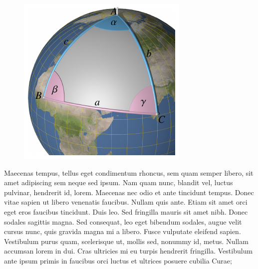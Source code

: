\documentclass[12pt]{article}
\begin{document}
\begin{figure}
\includegraphics{position2-small.pdf}
\end{figure}
Maecenas tempus, tellus eget condimentum rhoncus, sem quam semper
libero, sit amet adipiscing sem neque sed ipsum. Nam quam nunc,
blandit vel, luctus pulvinar, hendrerit id, lorem. Maecenas nec
odio et ante tincidunt tempus. Donec vitae sapien ut libero venenatis
faucibus. Nullam quis ante. Etiam sit amet orci eget eros faucibus
tincidunt. Duis leo. Sed fringilla mauris sit amet nibh. Donec
sodales sagittis magna. Sed consequat, leo eget bibendum sodales,
augue velit cursus nunc, quis gravida magna mi a libero. Fusce
vulputate eleifend sapien. Vestibulum purus quam, scelerisque ut,
mollis sed, nonummy id, metus. Nullam accumsan lorem in dui. Cras
ultricies mi eu turpis hendrerit fringilla. Vestibulum ante ipsum
primis in faucibus orci luctus et ultrices posuere cubilia Curae;

\pagebreak
\end{document}
